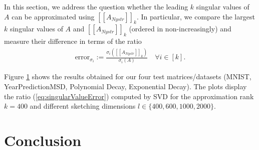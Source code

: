 \documentclass{article}
\theoremstyle{definition}
\begin{document}
In this section, we address the question whether the leading $k$ singular values of $A$ can be approximated using $[\![A_{Nystr}]\!]_k$. In particular, we compare the largest $k$ singular values of $A$ and $[\![A_{Nystr}]\!]_k$ (ordered in non-increasingly) and measure their difference in terms of the ratio
\begin{align}
    \label{eq:singularValueError}
    \text{error}_{\sigma_i} := \frac{\sigma_i([\![A_{Nystr}]\!]_k)}{\sigma_i(A)}
    \quad \forall i \in [k].
\end{align}

Figure \ref{} shows the results obtained for our four test matrices/datasets (MNIST, YearPredictionMSD, Polynomial Decay, Exponential Decay). The plots display the ratio (\ref{eq:singularValueError}) computed by SVD for the approximation rank $k=400$ and different sketching dimensions $l \in \{400, 600, 1000, 2000\}$.



\section{Conclusion}
\end{document}
